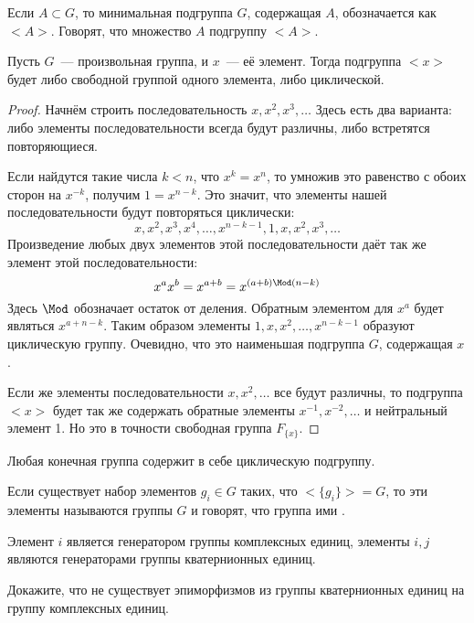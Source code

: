 Если $A\subset G$, то минимальная подгруппа $G$, содержащая $A$, обозначается как $<A>$. Говорят, что множество $A$  подгруппу $<A>$.

\begin{thm}
	Пусть $G$~--- произвольная группа, и $x$~--- её элемент. Тогда подгруппа $<x>$ будет либо свободной группой одного элемента, либо циклической.
\end{thm}
\begin{proof}
	Начнём строить последовательность $x, x^2, x^3, \ldots$ Здесь есть два варианта: либо элементы последовательности всегда будут различны, либо встретятся повторяющиеся.
	
	Если найдутся такие числа $k<n$, что $x^k = x^n$, то умножив это равенство с обоих сторон на $x^{-k}$, получим $1 = x^{n-k}$. Это значит, что элементы нашей последовательности будут повторяться циклически:
	\[
	x, x^2, x^3, x^4, \ldots, x^{n-k-1}, 1, x, x^2, x^3, \ldots
	\]
	Произведение любых двух элементов этой последовательности даёт так же элемент этой последовательности:
	\[
	x^a x^b = x^{a + b} = x^{(a+b)\Mod (n-k)}
	\]
	Здесь $\Mod$ обозначает остаток от деления. Обратным элементом для $x^a$ будет являться $x^{a+n-k}$. Таким образом элементы $1, x, x^2, \ldots, x^{n-k-1}$ образуют циклическую группу. Очевидно, что это наименьшая подгруппа $G$, содержащая $x$.
	
	Если же элементы последовательности $x, x^2, \ldots$ все будут различны, то подгруппа $<x>$ будет так же содержать обратные элементы $x^{-1}, x^{-2}, \ldots$ и нейтральный элемент 1. Но это в точности свободная группа $F_{\{x\}}$.
\end{proof}

\begin{corollary}
	Любая конечная группа содержит в себе циклическую подгруппу.
\end{corollary}

\begin{definition}
	Если существует набор элементов $g_i \in G$ таких, что $<\{g_i\}> = G$, то эти элементы называются  группы $G$ и говорят, что группа ими .
\end{definition}

\begin{example}
	Элемент $i$ является генератором группы комплексных единиц, элементы $i, j$ являются генераторами группы кватернионных единиц.
\end{example}

\begin{exercise}
	Докажите, что не существует эпиморфизмов из группы кватернионных единиц на группу комплексных единиц.
\end{exercise}

